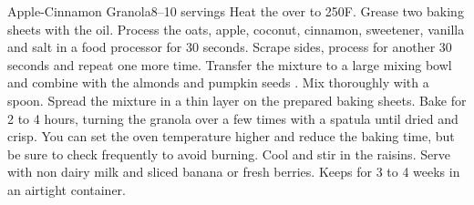 \documentclass[12pt,a4paper]{article}
\begin{document}
\begin{recipe}{Apple-Cinnamon Granola}{8--10 servings}{}
  Heat the over to 250\0F. Grease two baking sheets with the oil.
  Process the oats, apple, coconut, cinnamon, sweetener, vanilla and salt in a food processor for 30 seconds. Scrape sides, process for another 30 seconds and repeat one more time.
  Transfer the mixture to a large mixing bowl and combine with the almonds and pumpkin seeds . Mix thoroughly with a spoon.
  \newstep
  Spread the mixture in a thin layer on the prepared baking sheets. Bake for 2 to 4 hours, turning the granola over a few times with a spatula until dried and crisp. You can set the oven temperature higher and reduce the baking time, but be sure to check frequently to avoid burning.
  Cool and stir in the raisins. Serve with non dairy milk and sliced banana or fresh berries. Keeps for 3 to 4 weeks in an airtight container.
\end{recipe}
\end{document}
